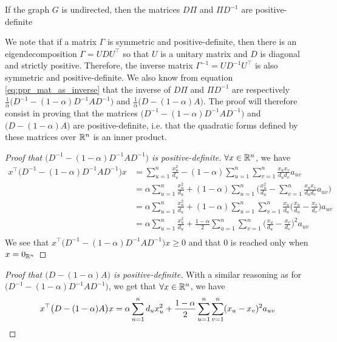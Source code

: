 \begin{theorem}\label{th:dpi_pidm_symdefpos}
    If the graph $G$ is undirected, then the matrices $D\Pi$ and $\Pi D^{-1}$ are positive-definite
\end{theorem}
We note that if a matrix $\Gamma$ is symmetric and positive-definite, then there is an eigendecomposition $\Gamma = U D U^\top$ so that $U$ is a unitary matrix and $D$ is diagonal and strictly positive. Therefore, the inverse matrix $\Gamma^{-1} = U D^{-1} U^\top$ is also symmetric and positive-definite. We also know from equation \ref{eq:ppr_mat_as_inverse} that the inverse of $D\Pi$ and $\Pi D^{-1}$ are respectively $\frac{1}{\alpha} \big(D^{-1} - (1-\alpha)D^{-1} A D^{-1}\big)$ and $\frac{1}{\alpha} \big(D - (1-\alpha)A\big)$. The proof will therefore consist in proving that the matrices $\big(D^{-1} - (1-\alpha)D^{-1} A D^{-1}\big)$ and $\big(D - (1-\alpha)A\big)$ are positive-definite, i.e. that the quadratic forms defined by these matrices over $\mathbb{R}^n$ is an inner product.

\begin{proof}[Proof that $\big(D^{-1} - (1-\alpha)D^{-1} A D^{-1}\big)$ is positive-definite]

    $\forall x \in \mathbb{R}^n$, we have
    \begin{equation*}
        \begin{split}
            x^\top \big(D^{-1} - (1-\alpha)D^{-1} A D^{-1}\big) x &= \sum_{u=1}^n \frac{x_u^2}{d_u} - (1-\alpha)\sum_{u=1}^n \sum_{v=1}^n \frac{x_u x_v}{d_u d_v} a_{uv}\\
            & = \alpha \sum_{u=1}^n \frac{x_u^2}{d_u} + (1-\alpha)\sum_{u=1}^n\big(\frac{x_u^2}{d_u} - \sum_{v=1}^n \frac{x_u x_v}{d_u d_v} a_{uv}\big)\\
            & = \alpha \sum_{u=1}^n \frac{x_u^2}{d_u} + (1-\alpha)\sum_{u=1}^n\sum_{v=1}^n\frac{x_u}{d_u}\big(\frac{x_u}{d_u} - \frac{x_v}{d_v}\big)a_{uv}\\
            & = \alpha \sum_{u=1}^n \frac{x_u^2}{d_u} + \frac{1-\alpha}{2}\sum_{u=1}^n\sum_{v=1}^n\big(\frac{x_u}{d_u} - \frac{x_v}{d_v}\big)^2a_{uv}\\
        \end{split}
    \end{equation*}
    We see that $x^\top \big(D^{-1} - (1-\alpha)D^{-1} A D^{-1}\big) x \geq 0$ and that $0$ is reached only when $x=0_{\mathbb{R}^n}$
\end{proof}

\begin{proof}[Proof that $\big(D - (1-\alpha) A\big)$ is positive-definite]

With a similar reasoning as for $\allowbreak\big(D^{-1} - (1-\alpha)D^{-1} A D^{-1}\big)$, we get that $\forall x \in \mathbb{R}^n$, we have
\begin{equation*}
    x^\top\big(D - (1-\alpha) A\big)x = \alpha \sum_{u=1}^n d_u x_u^2 + \frac{1-\alpha}{2}\sum_{u=1}^n\sum_{v=1}^n(x_u - x_v)^2a_{uv}\\ 
\end{equation*}
\end{proof}

